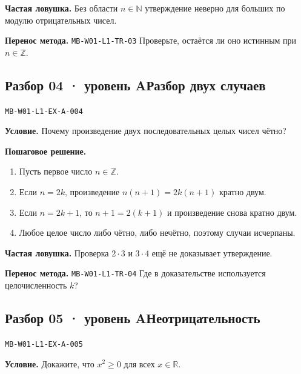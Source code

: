 \documentclass[11pt,a4paper,openany]{book}
\newcommand{\mtag}[1]{\textsf{\small\color{mbaccent}\bfseries #1}}
\newcommand{\muid}[1]{\texttt{\footnotesize #1}}
\begin{document}
\begin{learnbox}\textbf{Частая ловушка.} Без области $n\in\mathbb N$ утверждение неверно для больших по модулю отрицательных чисел.\par \textbf{Перенос метода.} \muid{MB-W01-L1-TR-03} Проверьте, остаётся ли оно истинным при $n\in\mathbb Z$.\end{learnbox}

\subsection*{\mtag{Разбор 04 · уровень A}\quad Разбор двух случаев}\hypertarget{MB-W01-L1-EX-A-004}{}

\muid{MB-W01-L1-EX-A-004}\par

\begin{keybox}\textbf{Условие.} Почему произведение двух последовательных целых чисел чётно?\end{keybox}

\textbf{Пошаговое решение.}\par
\begin{enumerate}[label=\arabic*),leftmargin=*,itemsep=3pt,topsep=4pt]
\item Пусть первое число $n\in\mathbb Z$.
\item Если $n=2k$, произведение $n(n+1)=2k(n+1)$ кратно двум.
\item Если $n=2k+1$, то $n+1=2(k+1)$ и произведение снова кратно двум.
\item Любое целое число либо чётно, либо нечётно, поэтому случаи исчерпаны.
\end{enumerate}


\begin{learnbox}\textbf{Частая ловушка.} Проверка $2\cdot3$ и $3\cdot4$ ещё не доказывает утверждение.\par \textbf{Перенос метода.} \muid{MB-W01-L1-TR-04} Где в доказательстве используется целочисленность $k$?\end{learnbox}

\subsection*{\mtag{Разбор 05 · уровень A}\quad Неотрицательность}\hypertarget{MB-W01-L1-EX-A-005}{}

\muid{MB-W01-L1-EX-A-005}\par

\begin{keybox}\textbf{Условие.} Докажите, что $x^2\ge0$ для всех $x\in\mathbb R$.\end{keybox}
\end{document}
